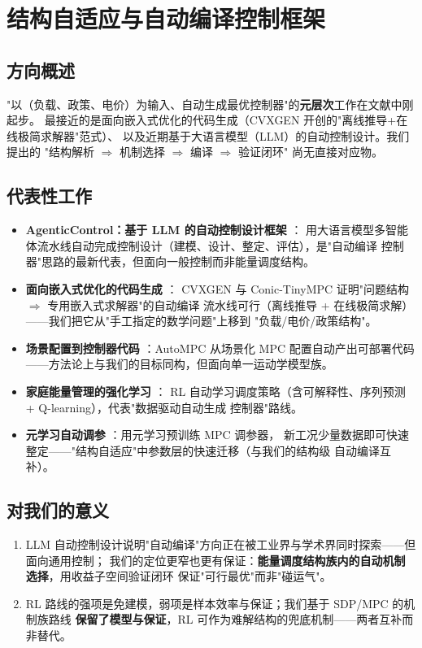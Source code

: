 \documentclass[10pt, twocolumn]{article}
\begin{document}
\section{结构自适应与自动编译控制框架}\label{sec:framework}

\subsection{方向概述}
"以（负载、政策、电价）为输入、自动生成最优控制器"的\textbf{元层次}工作在文献中刚起步。
最接近的是面向嵌入式优化的代码生成（CVXGEN 开创的"离线推导+在线极简求解器"范式）、
以及近期基于大语言模型（LLM）的自动控制设计。我们提出的
"结构解析 $\Rightarrow$ 机制选择 $\Rightarrow$ 编译 $\Rightarrow$ 验证闭环"
尚无直接对应物。

\subsection{代表性工作}
\begin{itemize}
\item \textbf{AgenticControl：基于 LLM 的自动控制设计框架} \cite{agenticcontrol}：
用大语言模型多智能体流水线自动完成控制设计（建模、设计、整定、评估），是"自动编译
控制器"思路的最新代表，但面向一般控制而非能量调度结构。
\item \textbf{面向嵌入式优化的代码生成} \cite{mattingley_cvxgen, mahajan_tinympc}：
CVXGEN 与 Conic-TinyMPC 证明"问题结构 $\Rightarrow$ 专用嵌入式求解器"的自动编译
流水线可行（离线推导 + 在线极简求解）——我们把它从"手工指定的数学问题"上移到
"负载/电价/政策结构"。
\item \textbf{场景配置到控制器代码} \cite{schildbach_autompc}：AutoMPC 从场景化 MPC
配置自动产出可部署代码——方法论上与我们的目标同构，但面向单一运动学模型族。
\item \textbf{家庭能量管理的强化学习} \cite{gokhale_rl_hems, razghandi_seq2seq_qlearning}：
RL 自动学习调度策略（含可解释性、序列预测 + Q-learning），代表"数据驱动自动生成
控制器"路线。
\item \textbf{元学习自动调参} \cite{li_metalearning_mpc}：用元学习预训练 MPC 调参器，
新工况少量数据即可快速整定——"结构自适应"中参数层的快速迁移（与我们的结构级
自动编译互补）。
\end{itemize}

\subsection{对我们的意义}
\begin{enumerate}
\item LLM 自动控制设计说明"自动编译"方向正在被工业界与学术界同时探索——但面向通用控制；
我们的定位更窄也更有保证：\textbf{能量调度结构族内的自动机制选择}，用收益子空间验证闭环
保证"可行最优"而非"碰运气"。
\item RL 路线的强项是免建模，弱项是样本效率与保证；我们基于 SDP/MPC 的机制族路线
\textbf{保留了模型与保证}，RL 可作为难解结构的兜底机制——两者互补而非替代。
\end{enumerate}
\end{document}
